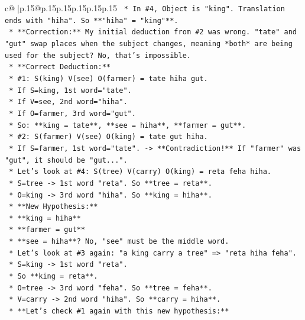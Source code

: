 \documentclass{article}
\begin{document}
{\begin{supertabular}{c@{$\;$}|p{.15\linewidth}@{}p{.15\linewidth}p{.15\linewidth}p{.15\linewidth}p{.15\linewidth}p{.15\linewidth}}
{{{\texttt{        *   In \#4, Object is "king". Translation ends with "hiha". So **"hiha" = "king"**.} \\
\texttt{    *   **Correction:** My initial deduction from \#2 was wrong. "tate" and "gut" swap places when the subject changes, meaning *both* are being used for the subject? No, that's impossible.} \\
\texttt{    *   **Correct Deduction:**} \\
\texttt{        *   \#1: S(king) V(see) O(farmer) = tate hiha gut.} \\
\texttt{            *   If S=king, 1st word="tate".} \\
\texttt{            *   If V=see, 2nd word="hiha".} \\
\texttt{            *   If O=farmer, 3rd word="gut".} \\
\texttt{            *   So: **king = tate**, **see = hiha**, **farmer = gut**.} \\
\texttt{        *   \#2: S(farmer) V(see) O(king) = tate gut hiha.} \\
\texttt{            *   If S=farmer, 1st word="tate". {-}> **Contradiction!** If "farmer" was "gut", it should be "gut...".} \\
\texttt{            *   Let's look at \#4: S(tree) V(carry) O(king) = reta feha hiha.} \\
\texttt{            *   S=tree {-}> 1st word "reta". So **tree = reta**.} \\
\texttt{            *   O=king {-}> 3rd word "hiha". So **king = hiha**.} \\
\texttt{        *   **New Hypothesis:**} \\
\texttt{            *   **king = hiha**} \\
\texttt{            *   **farmer = gut**} \\
\texttt{            *   **see = hiha**? No, "see" must be the middle word.} \\
\texttt{            *   Let's look at \#3 again: "a king carry a tree" => "reta hiha feha".} \\
\texttt{            *   S=king {-}> 1st word "reta".} \\
\texttt{            *   So **king = reta**.} \\
\texttt{            *   O=tree {-}> 3rd word "feha". So **tree = feha**.} \\
\texttt{            *   V=carry {-}> 2nd word "hiha". So **carry = hiha**.} \\
\texttt{        *   **Let's check \#1 again with this new hypothesis:**} \\
}}}
\end{supertabular}}
\end{document}
